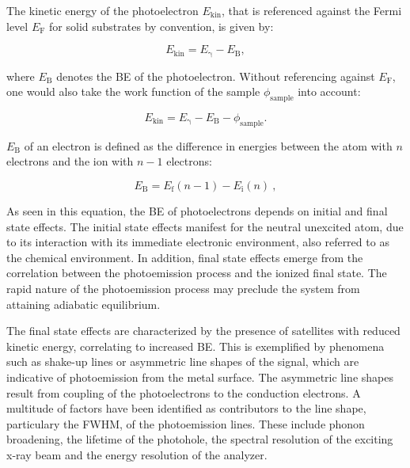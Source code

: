 The kinetic energy of the photoelectron $E_\mathrm{kin}$, that is referenced against the Fermi level $E_\mathrm{F}$ for solid substrates by convention, is given by\autocite{Woodruff2016,Briggs1992}:

\begin{equation}
    \label{eq:KineticEnergy1}
    E_\mathrm{kin} = E_\mathrm{\gamma} - E_\mathrm{B},
\end{equation}

where $E_\mathrm{B}$ denotes the \acl{BE} of the photoelectron. Without referencing against $E_\mathrm{F}$, one would also take the work function of the sample $\phi_\mathrm{sample}$ into account:

\begin{equation}
	\label{eq:KineticEnergy2}
	E_\mathrm{kin} = E_\mathrm{\gamma} - E_\mathrm{B}-\phi_\mathrm{sample}.
\end{equation}

 $E_\mathrm{B}$ of an electron is defined as the difference in energies between the atom with $n$ electrons and the ion with $n-1$ electrons:

\begin{equation}
    \label{eq:BindingEnergy}
    E_\mathrm{B}=E_\mathrm{f}(n-1)-E_\mathrm{i}(n)~,
\end{equation}

As seen in this equation, the \ac{BE} of photoelectrons depends on initial and final state effects. The initial state effects manifest for the neutral unexcited atom, due to its interaction with its immediate electronic environment, also referred to as the chemical environment. In addition, final state effects emerge from the correlation between the photoemission process and the ionized final state. The rapid nature of the photoemission process may preclude the system from attaining adiabatic equilibrium.\autocite{Woodruff2016}

The final state effects are characterized by the presence of satellites with reduced kinetic energy, correlating to increased \ac{BE}. This is exemplified by phenomena such as shake-up lines or asymmetric line shapes of the signal, which are indicative of photoemission from the metal surface. The asymmetric line shapes result from coupling of the photoelectrons to the conduction electrons.\autocite{Moulder1993}
A multitude of factors have been identified as contributors to the line shape, particulary the \ac{FWHM}, of the photoemission lines. These include phonon broadening, the lifetime of the photohole, the spectral resolution of the exciting x-ray beam and the energy resolution of the analyzer.\autocite{Moulder1993,Fairley2021}

\cleardoublepage